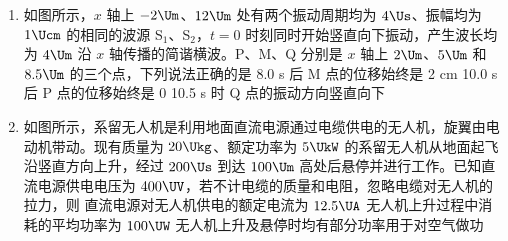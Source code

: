 \documentclass[\gkver]{gaokaozhenti}
\begin{document}
\begin{enumerate}
{B．根据能量关系可知 $m_{n}c^{2}=1876.1+2809.5-3728.4-17.6$，解得 $m_{n}=939.6\UMeV/c^{2}$，选项 B 正确；

C．太阳每秒放出的能量 $E=Pt=4\times10^{26}\UJ$，损失的质量 $\Delta m=\frac{E}{c^{2}}=\frac{4\times10^{26}}{9\times10^{16}}\Ukg\approx4.4\times10^{9}\Ukg$，选项 C 正确；

D．因为 $E=4\times10^{26}\UJ=\frac{4\times10^{26}}{1.6\times10^{-19}}\UeV=2.5\times10^{45}\UeV=2.5\times10^{39}\UMeV$，则太阳每秒因为辐射损失的质量为 $\Delta m=\frac{E}{c^{2}}=2.5\times10^{39}\UMeV/c^{2}$，选项 D 错误。

故选 BC。
}

\item
如图所示，$x$ 轴上 $-2\Um$、$12\Um$ 处有两个振动周期均为 $4\Us$、振幅均为 $1\Ucm$ 的相同的波源 S$_{1}$、S$_{2}$，$t=0$ 时刻同时开始竖直向下振动，产生波长均为 $4\Um$ 沿 $x$ 轴传播的简谐横波。P、M、Q 分别是 $x$ 轴上 $2\Um$、$5\Um$ 和 $8.5\Um$ 的三个点，下列说法正确的是
\onepicture[w=8.00cm]{}
{8.0 s 后 M 点的位移始终是 2 cm}
{10.0 s 后 P 点的位移始终是 0}
{10.5 s 时 Q 点的振动方向竖直向下}

\item
如图所示，系留无人机是利用地面直流电源通过电缆供电的无人机，旋翼由电动机带动。现有质量为 $20\Ukg$、额定功率为 $5\UkW$ 的系留无人机从地面起飞沿竖直方向上升，经过 $200\Us$ 到达 $100\Um$ 高处后悬停并进行工作。已知直流电源供电电压为 $400\UV$，若不计电缆的质量和电阻，忽略电缆对无人机的拉力，则
{直流电源对无人机供电的额定电流为 $12.5\UA$}
{无人机上升过程中消耗的平均功率为 $100\UW$}
{无人机上升及悬停时均有部分功率用于对空气做功}
\end{enumerate}
\end{document}
